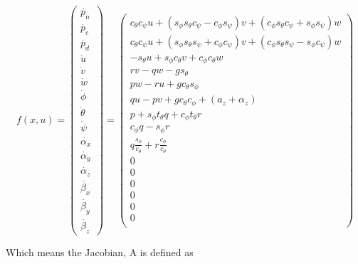 \documentclass{article}
\newcommand{\cp}{c_{\phi}}
\newcommand{\ct}{c_{\theta}}
\newcommand{\cs}{c_{\psi}}
\newcommand{\sip}{s_{\phi}}
\newcommand{\sit}{s_{\theta}}
\newcommand{\sis}{s_{\psi}}
\newcommand{\tant}{t_{\theta}}
\begin{document}
\begin{equation}
	f(x,u) = \begin{pmatrix}
						\dot{p_n} \\ \dot{p_e} \\ \dot{p_d} \\ \dot{u} \\ \dot{v} \\ \dot{w} \\ \dot{\phi} \\ \dot{\theta} \\ \dot{\psi} \\ \dot{\alpha_x} \\ \dot{\alpha_y} \\ \dot{\alpha_z} \\ \dot{\beta_x} \\ \dot{\beta_y} \\ \dot{\beta_z} \end{pmatrix} =
					\begin{pmatrix}
					\ct\cs u + \left(\sip\sit\cs-\cp\sis\right) v + \left(\cp\sit\cs+\sip\sis\right)w \\
					\ct\cs u + \left(\sip\sit\sis+\cp\cs\right) v + \left(\cp\sit\sis-\sip\cs\right)w \\
					-\sit  u + \sip\ct v                          +\cp\ct w          \\
					rv-qw - g\sit \\
					pw-ru + g\ct\sip \\
					qu-pv + g\ct\cp + (a_z + \alpha_z) \\
					p + \sip\tant q + \cp\tant r \\
					\cp q - \sip r \\
					q \tfrac{\sip}{\ct} + r \tfrac{\cp}{\ct} \\
					0 \\ 0 \\ 0 \\ 0 \\ 0 \\ 0 \\
					\end{pmatrix}
\end{equation}

Which means the Jacobian, A is defined as
\end{document}
